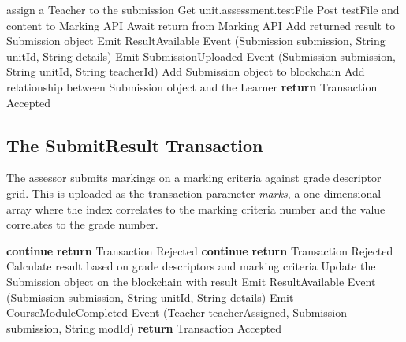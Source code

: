 \begin{algorithm}
	\begin{algorithmic}[0]
		\State assign a Teacher to the submission
		\State Get unit.assessment.testFile
		\State Post testFile and content to Marking API 
		\State Await return from Marking API
		\State Add returned result to Submission object
		\State Emit ResultAvailable Event (Submission submission, String unitId, String details)
		\State Emit SubmissionUploaded Event (Submission submission, String unitId, String teacherId)
		\EndIf
		\State Add Submission object to blockchain
		\State Add relationship between Submission object and the Learner
		\State \textbf{return} Transaction Accepted
		\EndFunction
	\end{algorithmic}
\end{algorithm}

\subsection{The SubmitResult Transaction}

The assessor submits markings on a marking criteria against grade descriptor grid. This is uploaded as the transaction
parameter \textit{marks}, a one dimensional array where the index correlates to the marking criteria number and
the value correlates to the grade number.

\begin{algorithm}
	\begin{algorithmic}[0]
		\State \textbf{continue}
		\Else \textbf{ return} Transaction Rejected
		\EndIf
		\State \textbf{continue}
		\Else \textbf{ return} Transaction Rejected
		\EndIf
		\State Calculate result based on grade descriptors and marking criteria
		\State Update the Submission object on the blockchain with result
		\State Emit ResultAvailable Event (Submission submission, String unitId, String details)
		\State Emit CourseModuleCompleted Event (Teacher teacherAssigned, Submission submission, String modId)
		\EndIf
		\EndIf
		\State \textbf{return} Transaction Accepted
		\EndFunction
	\end{algorithmic}
\end{algorithm}

